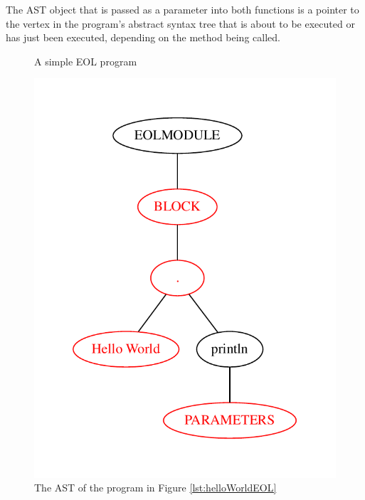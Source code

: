 The AST object that is passed as a parameter into both functions is a pointer to the vertex in the program's abstract syntax tree that is about to be executed or has just been executed, depending on the method being called. 

\begin{figure}
\centering
\begin{minipage}{.5\textwidth}
  \centering
  
  \caption{A simple EOL program}
  \label{lst:helloWorldEOL}
\end{minipage}%
\begin{minipage}{.5\textwidth}
  \centering
  \includegraphics[scale=0.5]{figures/HelloWorldAST.pdf}
  \caption{The AST of the program in Figure \ref{lst:helloWorldEOL}}
  \label{fig:helloWorldAST}
\end{minipage}
\end{figure}

